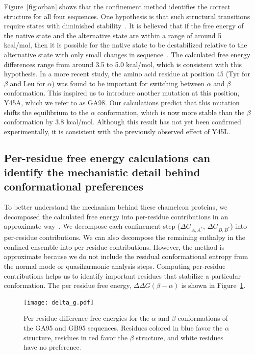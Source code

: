 \documentclass[12pt]{article}
\begin{document}
Figure~\ref{fig:orban} shows that the confinement method identifies the correct structure for all four sequences. One
hypothesis is that such structural transitions require states with diminished stability~\cite{Bryan2010}. It is believed
that if the free energy of the native state and the alternative state are within a range of around 5 kcal/mol, then it
is possible for the native state to be destabilized relative to the alternative state with only small changes in
sequence~\cite{He2008,Alexander2009,Bryan2010}. The calculated free energy differences range from around 3.5 to 5.0
kcal/mol, which is consistent with this hypothesis. In a more recent study\cite{He2012}, the amino acid residue at
position 45 (Tyr for $\beta$ and Leu for $\alpha$) was found to be important for switching between $\alpha$ and $\beta$
conformation. This inspired us to introduce another mutation at this position, Y45A, which we refer to as GA98. Our
calculations predict that this mutation shifts the equilibrium to the $\alpha$ conformation, which is now more stable
than the $\beta$ conformation by 3.8 kcal/mol. Although this result has not yet been confirmed experimentally, it is
consistent with the previously observed effect of Y45L.

\subsection*{Per-residue free energy calculations can identify the mechanistic detail behind conformational preferences}

To better understand the mechanism behind these chameleon proteins, we decomposed the calculated free energy into
per-residue contributions in an approximate way~\cite{Tyka2006}. We decompose each confinement step ($\Delta
G_{A,A^\ast}$, $\Delta G_{B,B^\ast}$) into per-residue contributions. We can also decompose the remaining enthalpy in
the confined ensemble into per-residue contributions. However, the method is approximate because we do not include the
residual conformational entropy from the normal mode or quasiharmonic analysis steps. Computing per-residue
contributions helps us to identify important residues that stabilize a particular conformation. The per residue free
energy, $\Delta \Delta G (\beta - \alpha)$ is shown in Figure~\ref{fig:perresidue_orban}.

\begin{figure}
    \begin{center}
        \texttt{[image: delta\_g.pdf]}
    \end{center}
    \caption{Per-residue difference free energies for the $\alpha$ and $\beta$ conformations of the GA95 and GB95
        sequences. Residues colored in blue favor the $\alpha$ structure, residues in red favor the $\beta$ structure,
        and white residues have no preference.}
\label{fig:perresidue_orban}
\end{figure}
\end{document}
